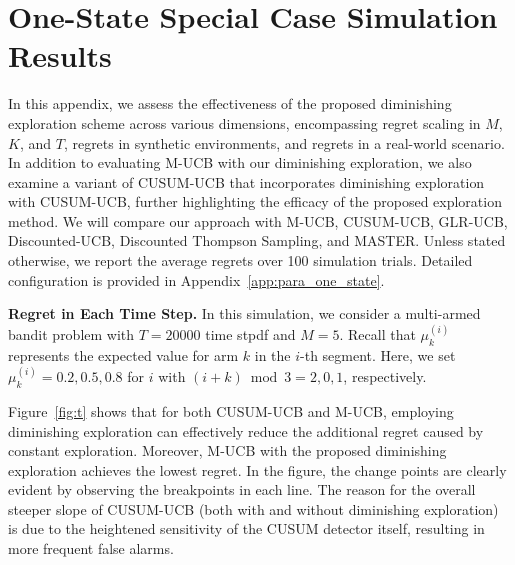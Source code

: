 \documentclass[twoside]{article}
\theoremstyle{plain}
\theoremstyle{definition}
\theoremstyle{remark}
\begin{document}
\section{One-State Special Case Simulation Results}
\label{app:sim}
In this appendix, we assess the effectiveness of the proposed diminishing exploration scheme across various dimensions, encompassing regret scaling in $M$, $K$, and $T$, regrets in synthetic environments, and regrets in a real-world scenario. In addition to evaluating M-UCB \citep{cao2019nearly} with our diminishing exploration, we also examine a variant of CUSUM-UCB \citep{liu2018change} that incorporates diminishing exploration with CUSUM-UCB, further highlighting the efficacy of the proposed exploration method. We will compare our approach with M-UCB, CUSUM-UCB, GLR-UCB, Discounted-UCB, Discounted Thompson Sampling, and MASTER. 
Unless stated otherwise, we report the average regrets over 100 simulation trials. Detailed configuration is provided in Appendix~\ref{app:para_one_state}.


{\bf Regret in Each Time Step.} In this simulation, we consider a multi-armed bandit problem with $T = 20000$ time stpdf and $M=5$. 
Recall that $\mu^{(i)}_{k}$ represents the expected value for arm $k$ in the $i$-th segment. Here, we set $\mu^{(i)}_{k}=0.2,0.5,0.8$ for $i$ with $(i+k)\bmod 3=2, 0, 1$, respectively.

Figure~\ref{fig:t} shows that for both CUSUM-UCB and M-UCB, employing diminishing exploration can effectively reduce the additional regret caused by constant exploration. 
Moreover, M-UCB with the proposed diminishing exploration achieves the lowest regret. In the figure, the change points are clearly evident by observing the breakpoints in each line. The reason for the overall steeper slope of CUSUM-UCB (both with and without diminishing exploration) is due to the heightened sensitivity of the CUSUM detector itself, resulting in more frequent false alarms. 
\end{document}
